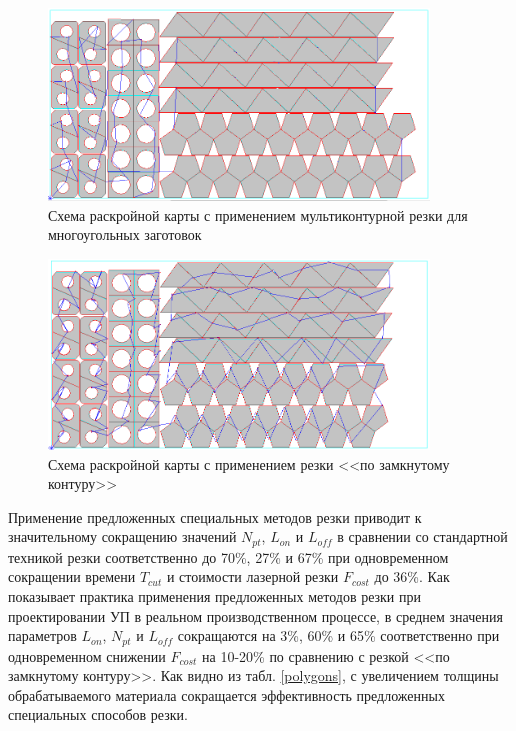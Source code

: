 \documentclass[11pt,twoside]{report}
\begin{document}
\begin{figure}
  \begin{center}
  \includegraphics[width=0.9\textwidth]{multi-a.png}
  \caption{Схема раскройной карты с применением мультиконтурной резки для многоугольных заготовок}
  \label{multi-a}
  \end{center}
\end{figure}

\begin{figure}
  \begin{center}
  \includegraphics[width=0.9\textwidth]{multi-b.png}
  \caption{Схема раскройной карты с применением резки <<по замкнутому контуру>>}
  \label{multi-b}
  \end{center}
\end{figure}

Применение предложенных специальных методов резки
приводит к значительному сокращению значений
$N_{pt}$, $L_{on}$ и $L_{off}$
в сравнении со стандартной техникой резки
соответственно до 70\%, 27\% и 67\%
при одновременном сокращении времени
$T_{cut}$
и стоимости лазерной резки
$F_{cost}$ до 36\%.
Как показывает практика применения
предложенных методов резки при проектировании
УП в реальном производственном процессе,
в среднем значения параметров
$L_{on}$, $N_{pt}$  и $L_{off}$
сокращаются на 3\%, 60\% и 65\%
соответственно при одновременном снижении
$F_{cost}$
на 10-20\%
по сравнению с резкой <<по замкнутому контуру>>.
Как видно из табл. \ref{polygons},
с увеличением толщины обрабатываемого материала
сокращается эффективность предложенных специальных способов резки.
\end{document}
